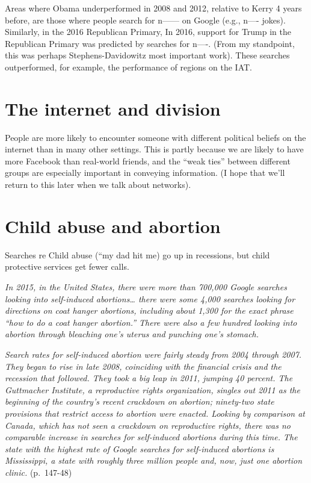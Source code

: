 \documentclass[]{book}
\theoremstyle{definition}
\theoremstyle{definition}
\theoremstyle{definition}
\theoremstyle{remark}
\begin{document}
Areas where Obama underperformed in 2008 and 2012, relative to Kerry 4
years before, are those where people search for n------ on Google (e.g.,
n---- jokes). Similarly, in the 2016 Republican Primary, In 2016,
support for Trump in the Republican Primary was predicted by searches
for n----. (From my standpoint, this was perhaps Stephens-Davidowitz
most important work). These searches outperformed, for example, the
performance of regions on the IAT.

\section{The internet and division}\label{the-internet-and-division}

People are more likely to encounter someone with different political
beliefs on the internet than in many other settings. This is partly
because we are likely to have more Facebook than real-world friends, and
the ``weak ties'' between different groups are especially important in
conveying information. (I hope that we'll return to this later when we
talk about networks).

\section{Child abuse and abortion}\label{child-abuse-and-abortion}

Searches re Child abuse (``my dad hit me) go up in recessions, but child
protective services get fewer calls.

\emph{In 2015, in the United States, there were more than 700,000 Google
searches looking into self-induced abortions\ldots{} there were some
4,000 searches looking for directions on coat hanger abortions,
including about 1,300 for the exact phrase ``how to do a coat hanger
abortion.'' There were also a few hundred looking into abortion through
bleaching one's uterus and punching one's stomach.}

\emph{Search rates for self-induced abortion were fairly steady from
2004 through 2007. They began to rise in late 2008, coinciding with the
financial crisis and the recession that followed. They took a big leap
in 2011, jumping 40 percent. The Guttmacher Institute, a reproductive
rights organization, singles out 2011 as the beginning of the country's
recent crackdown on abortion; ninety-two state provisions that restrict
access to abortion were enacted. Looking by comparison at Canada, which
has not seen a crackdown on reproductive rights, there was no comparable
increase in searches for self-induced abortions during this time. The
state with the highest rate of Google searches for self-induced
abortions is Mississippi, a state with roughly three million people and,
now, just one abortion clinic.} (p.~147-48)
\end{document}
